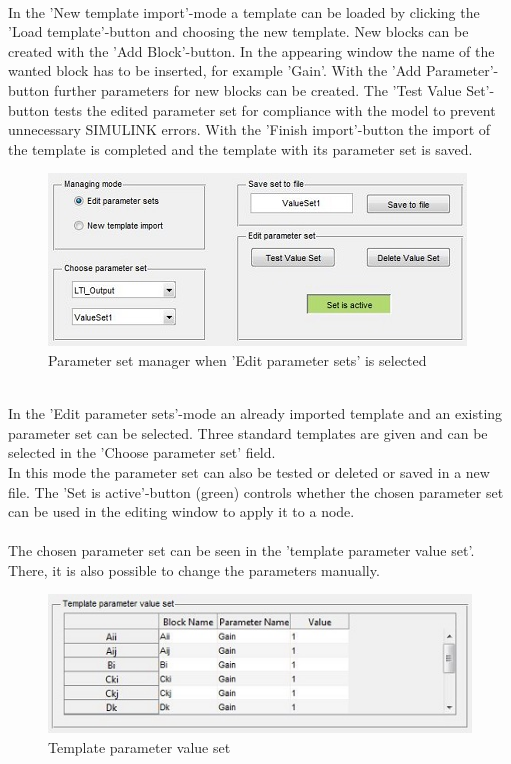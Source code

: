 \documentclass[12pt]{report}
\begin{document}
\\
In the 'New template import'-mode a template can be loaded by clicking the 'Load template'-button and choosing the new template. New blocks can be created with the 'Add Block'-button. In the appearing window the name of the wanted block has to be inserted, for example 'Gain'. With the 'Add Parameter'-button further parameters for new blocks can be created. The 'Test Value Set'-button tests the edited parameter set for compliance with the model to prevent unnecessary SIMULINK errors. With the 'Finish import'-button the import of the template is completed and the template with its parameter set is saved.\\
\begin{figure}[h]
\centering
\includegraphics[scale=.8]{mode1}
\caption{Parameter set manager when 'Edit parameter sets' is selected}
\label{FIG:abb15}
\end{figure}
\\
In the 'Edit parameter sets'-mode an already imported template and an existing parameter set can be selected. Three standard templates are given and can be selected in the 'Choose parameter set' field.\\
In this mode the parameter set can also be tested or deleted or saved in a new file. The 'Set is active'-button (green) controls whether the chosen parameter set can be used in the editing window to apply it to a node.\\
\\
The chosen parameter set can be seen in the 'template parameter value set'. There, it is also possible to change the parameters manually.
\begin{figure}[h]
\centering
\includegraphics[scale=.7]{tempparaset}
\caption{Template parameter value set}
\label{FIG:abb16}
\end{figure}
\end{document}
